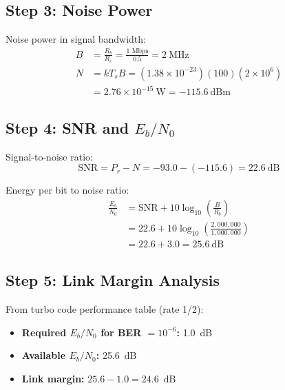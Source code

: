 \subsection*{Step 3: Noise Power}

Noise power in signal bandwidth:
\begin{equation}
\begin{aligned}
B &= \frac{R_b}{R_c} = \frac{1\text{~Mbps}}{0.5} = 2~\text{MHz} \\
N &= kT_sB = (1.38 \times 10^{-23})(100)(2 \times 10^6) \\
&= 2.76 \times 10^{-15}~\text{W} = -115.6~\text{dBm}
\end{aligned}
\end{equation}

\subsection*{Step 4: SNR and $E_b/N_0$}

Signal-to-noise ratio:
\begin{equation}
\text{SNR} = P_r - N = -93.0 - (-115.6) = 22.6~\text{dB}
\end{equation}

Energy per bit to noise ratio:
\begin{equation}
\begin{aligned}
\frac{E_b}{N_0} &= \text{SNR} + 10\log_{10}\left(\frac{B}{R_b}\right) \\
&= 22.6 + 10\log_{10}\left(\frac{2{,}000{,}000}{1{,}000{,}000}\right) \\
&= 22.6 + 3.0 = 25.6~\text{dB}
\end{aligned}
\end{equation}

\subsection*{Step 5: Link Margin Analysis}

From turbo code performance table (rate 1/2):
\begin{itemize}
\item \textbf{Required $E_b/N_0$ for BER $= 10^{-6}$:} 1.0~dB
\item \textbf{Available $E_b/N_0$:} 25.6~dB
\item \textbf{Link margin:} $25.6 - 1.0 = 24.6$~dB
\end{itemize}


